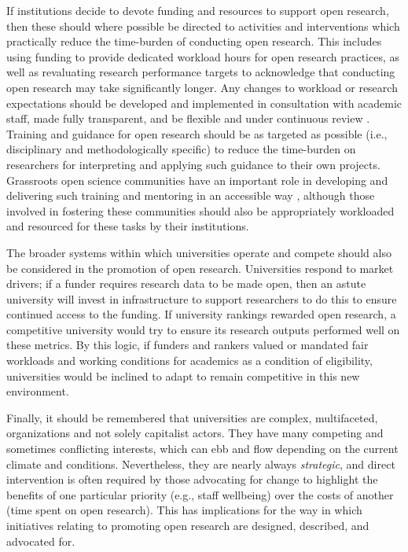 \documentclass[meta, authordate]{jote-new-article}
\begin{document}
If institutions decide to devote funding and resources to support open research, then these should where possible be directed to activities and interventions which practically reduce the time-burden of conducting open research. This includes using funding to provide dedicated workload hours for open research practices, as well as revaluating research performance targets to acknowledge that conducting open research may take significantly longer. Any changes to workload or research expectations should be developed and implemented in consultation with academic staff, made fully transparent, and be flexible and under continuous review \parencites{Kenny2022}. Training and guidance for open research should be as targeted as possible (i.e., disciplinary and methodologically specific) to reduce the time-burden on researchers for interpreting and applying such guidance to their own projects. Grassroots open science communities have an important role in developing and delivering such training and mentoring in an accessible way \parencites{Armeni2021}, although those involved in fostering these communities should also be appropriately workloaded and resourced for these tasks by their institutions.



The broader systems within which universities operate and compete should also be considered in the promotion of open research. Universities respond to market drivers; if a funder requires research data to be made open, then an astute university will invest in infrastructure to support researchers to do this to ensure continued access to the funding. If university rankings rewarded open research, a competitive university would try to ensure its research outputs performed well on these metrics. By this logic, if funders and rankers valued or mandated fair workloads and working conditions for academics as a condition of eligibility, universities would be inclined to adapt to remain competitive in this new environment.



Finally, it should be remembered that universities are complex, multifaceted, organizations and not solely capitalist actors. They have many competing and sometimes conflicting interests, which can ebb and flow depending on the current climate and conditions. Nevertheless, they are nearly always \emph{strategic}, and direct intervention is often required by those advocating for change to highlight the benefits of one particular priority (e.g., staff wellbeing) over the costs of another (time spent on open research). This has implications for the way in which initiatives relating to promoting open research are designed, described, and advocated for.
\end{document}
